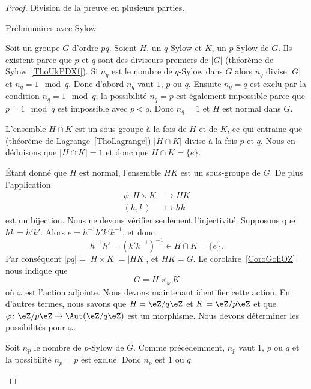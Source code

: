 \begin{proof}
	Division de la preuve en plusieurs parties.
	\begin{subproof}
		\item[Préliminaires avec Sylow]

		Soit un groupe \( G\) d'ordre \( pq\). Soient \( H\), un \( q\)-Sylow et \( K\), un \( p\)-Sylow de \( G\). Ils existent parce que \( p\) et \( q\) sont des diviseurs premiers de \( | G |\) (théorème de Sylow~\ref{ThoUkPDXf}). Si \( n_q\) est le nombre de \( q\)-Sylow dans \( G\) alors \( n_q\) divise \( | G |\) et \( n_q=1\mod q\). Donc d'abord \( n_q\) vaut \( 1\), \( p\) ou \( q\). Ensuite \( n_q=q\) est exclu par la condition \( n_q=1\mod q\); la possibilité \( n_q=p\) est également impossible parce que \( p=1\mod q\) est impossible avec \( p<q\). Donc \( n_q=1\) et \( H\) est normal dans \( G\).

		L'ensemble \( H\cap K\) est un sous-groupe à la fois de \( H\) et de \( K\), ce qui entraine que (théorème de Lagrange~\ref{ThoLagrange}) \( | H\cap K |\) divise à la fois \( p\) et \( q\). Nous en déduisons que \( | H\cap K |=1\) et donc que \( H\cap K=\{ e \}\).

		Étant donné que \( H\) est normal, l'ensemble \( HK\) est un sous-groupe de \( G\). De plus l'application
		\begin{equation}
			\begin{aligned}
				\psi\colon H\times K & \to HK     \\
				(h,k)                & \mapsto hk
			\end{aligned}
		\end{equation}
		est un bijection. Nous ne devons vérifier seulement l'injectivité. Supposons que \( hk=h'k'\). Alors \( e=h^{-1}h'k'k^{-1}\), et donc
		\begin{equation}
			h^{-1} h'=(k'k^{-1})^{-1}\in H\cap K=\{ e \}.
		\end{equation}
		Par conséquent \( | pq |=| H\times K |=| HK |\), et \( HK=G\). Le corolaire~\ref{CoroGohOZ} nous indique que
		\begin{equation}    \label{EqGjQjFN}
			G=H\times_{\varphi}K
		\end{equation}
		où \( \varphi\) est l'action adjointe. Nous devons maintenant identifier cette action. En d'autres termes, nous savons que \( H=\eZ/q\eZ\) et \( K=\eZ/p\eZ\) et que \( \varphi\colon \eZ/p\eZ\to \Aut(\eZ/q\eZ)\) est un morphisme. Nous devons déterminer les possibilités pour \( \varphi\).

		Soit \( n_p\) le nombre de \( p\)-Sylow de \( G\). Comme précédemment, \( n_p\) vaut \( 1\), \( p\) ou \( q\) et la possibilité \( n_p=p\) est exclue. Donc \( n_p\) est \( 1\) ou \( q\).


\end{subproof}
\end{proof}
